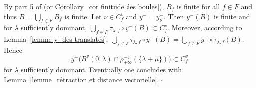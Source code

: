 \documentclass[12pt]{article}
\theoremstyle{plain}
\theoremstyle{definition}
\begin{document}
By part 5 of \cite{gaussent2014spherical} (or Corollary~\ref{cor finitude des boules}), $B_f$ is finite for all $f\in F$ and thus $B=\bigcup_{f\in F}B_f$ is finite.  Let $\nu\in C_f^v$ and $y^-=y_\nu^-$. Then $y^-(B)$ is finite and for $\lambda$ sufficiently dominant, $\bigcup_{f\in F}\tau_{\lambda,f}\circ y^-(B) \subset{C^v_f}$. Moreover, according to Lemma~\ref{lemme y- des translatés}, $\bigcup_{f\in F}\tau_{\lambda,f}\circ y^-(B)=\bigcup_{f\in F}y^-\circ \tau_{\lambda,f}(B)$. Hence \[y^-\big(B^v(0,\lambda)\cap \rho_{+\infty}^{-1}(\{\lambda+\mu\})\big)\subset C^v_f\] for $\lambda$ sufficiently dominant. Eventually one concludes with Lemma~\ref{lemme_rétraction et distance vectorielle}. $\square$




 


 
\end{document}
